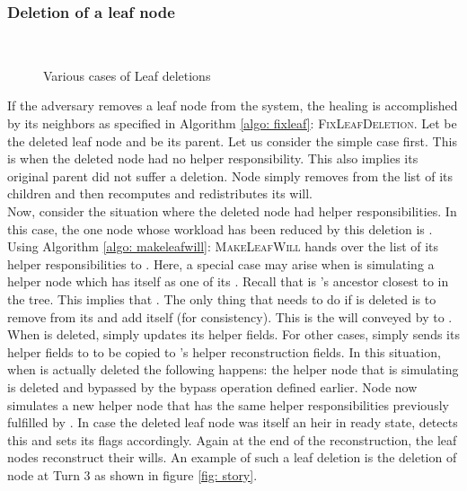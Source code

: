 \documentclass[11pt]{article}
\begin{document}
\subsubsection{Deletion of a leaf node}
\begin{figure}[h!]
\centering
{}\hspace{0.3in}
\\
\hspace{0.3in}
\caption{Various cases of Leaf deletions}
\end{figure} 
 If the adversary removes a leaf node from the system, the healing is accomplished by its neighbors as specified in
Algorithm \ref{algo: fixleaf}: \textsc{FixLeafDeletion}. Let  be the deleted leaf node and  be its parent. Let us
consider the simple case first.  This is when the deleted node had no helper responsibility. This also implies its
original parent did not suffer a deletion. Node  simply removes  from the list of its children and then
recomputes and redistributes its will.\\
  Now, consider the situation where the deleted node had helper responsibilities.  In this case, the one node whose
workload has been reduced by this deletion is . Using Algorithm \ref{algo: makeleafwill}:
\textsc{MakeLeafWill}  hands over the list of  its helper responsibilities to .  Here, a special
case may arise when  is simulating a helper node which has  itself as one of its . Recall that  is 's
ancestor closest to  in the tree. This implies that . The only thing that  needs
to do if  is deleted is to remove  from its  and add itself (for consistency). This is the will
conveyed by  to . When  is deleted,  simply updates its helper fields.
 For other cases,  simply sends its helper fields to  to be copied to 's helper reconstruction fields. In this
situation, when  is actually deleted the following happens: the helper node that  is simulating is deleted and
bypassed by the bypass operation defined earlier.  Node  now simulates a new helper node that has the same helper
responsibilities previously fulfilled by . In case the deleted leaf node was itself an heir in ready state, 
detects this and sets its flags accordingly. Again at the end of the reconstruction, the leaf nodes reconstruct their
wills. An example of such a leaf deletion is the deletion of  node   at Turn 3 as shown in  figure \ref{fig: story}.
\end{document}
